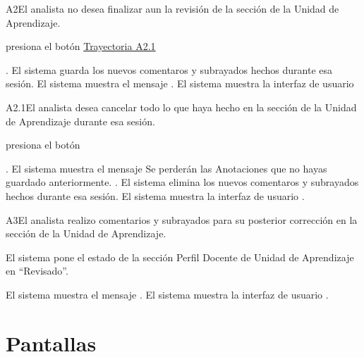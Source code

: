 	
\begin{UCtrayectoriaA}{A2}{El analista no desea finalizar aun la revisión de la sección de la Unidad de Aprendizaje.}

    \hypertarget{SP2-CU11-A2}{\UCpaso[\UCactor] presiona el botón  \hyperlink{SP2-CU11-A2.1}{Trayectoria A2.1}}. 
    \UCpaso El sistema guarda los nuevos comentaros y subrayados hechos durante esa sesión.
    \UCpaso El sistema muestra el mensaje .
    \UCpaso El sistema muestra la interfaz de usuario 
\end{UCtrayectoriaA}

\begin{UCtrayectoriaA}{A2.1}{El analista desea cancelar todo lo que haya hecho en la sección de la Unidad de Aprendizaje durante esa sesión.}

	\hypertarget{SP2-CU11-A2.1}{\UCpaso[\UCactor] presiona el botón }. 
    \UCpaso El sistema muestra el mensaje 
Se perderán las Anotaciones que no hayas guardado anteriormente. .
    \UCpaso El sistema elimina los nuevos comentaros y subrayados hechos durante esa sesión.
    \UCpaso El sistema muestra la interfaz de usuario .
\end{UCtrayectoriaA}

	
\begin{UCtrayectoriaA}{A3}{El analista realizo comentarios y subrayados para su posterior corrección en la sección de la Unidad de Aprendizaje.} 

	\hypertarget{SP2-CU11-A3}{\UCpaso El sistema pone el estado de la sección Perfil Docente de Unidad de Aprendizaje en “Revisado”.}
    \UCpaso El sistema muestra el mensaje .
    \UCpaso El sistema muestra la interfaz de usuario .
\end{UCtrayectoriaA}

\chapter{Pantallas}

